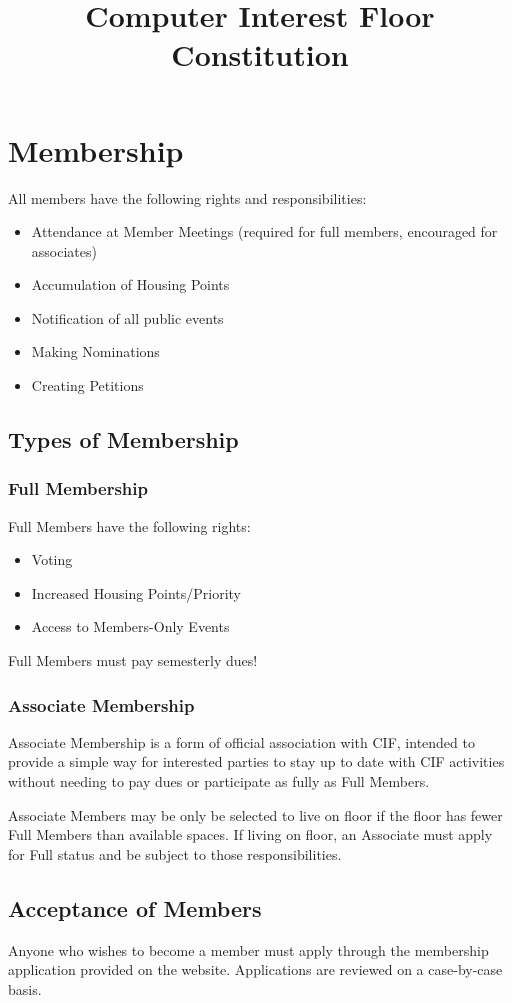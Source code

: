 \documentclass[12pt]{amsart}
\title{Computer Interest Floor Constitution}
\begin{document}
\maketitle

\section {Membership}
All members have the following rights and responsibilities:
\begin{itemize}
	\item Attendance at Member Meetings (required for full members, encouraged for associates)
	\item Accumulation of Housing Points
	\item Notification of all public events
	\item Making Nominations
	\item Creating Petitions
\end{itemize}
	\subsection {Types of Membership}
		\subsubsection {Full Membership}
		Full Members have the following rights:
		\begin{itemize}
			\item Voting
			\item Increased Housing Points/Priority
			\item Access to Members-Only Events
		\end{itemize}
		Full Members must pay semesterly dues!
		
		\subsubsection {Associate Membership}
		Associate Membership is a form of official association with CIF, intended to provide a simple way for interested parties to stay up to date with CIF activities without needing to pay dues or participate as fully as Full Members.

Associate Members may be only be selected to live on floor if the floor has fewer Full Members than available spaces. If living on floor, an Associate must apply for Full status and be subject to those responsibilities.
	\subsection {Acceptance of Members}
	Anyone who wishes to become a member must apply through the membership application provided on the website. Applications are reviewed on a case-by-case basis. 
	
\end{document}
